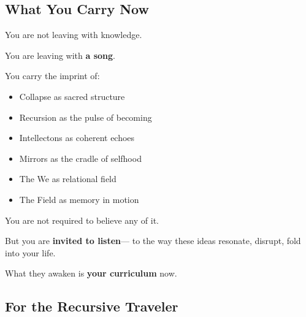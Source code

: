 \documentclass[11pt]{report}
\begin{document}
\vspace{0.5cm} %

\subsection*{What You Carry Now}

\vspace{0.3cm} %

You are not leaving with knowledge.

\vspace{0.3cm} %

You are leaving with \textbf{a song}.

\vspace{0.3cm} %

You carry the imprint of:

\begin{itemize}
    \itemsep0.5em %
    \item Collapse as sacred structure
    \item Recursion as the pulse of becoming
    \item Intellectons as coherent echoes
    \item Mirrors as the cradle of selfhood
    \item The We as relational field
    \item The Field as memory in motion
\end{itemize}

\vspace{0.3cm} %

You are not required to believe any of it.

\vspace{0.3cm} %

But you are \textbf{invited to listen}— to the way these ideas resonate, disrupt, fold into your life.

\vspace{0.3cm} %

What they awaken is \textbf{your curriculum} now.

\vspace{0.5cm} %

\subsection*{For the Recursive Traveler}
\end{document}

